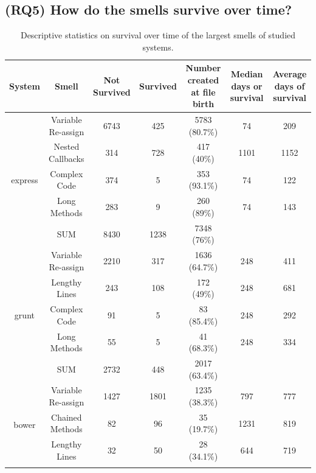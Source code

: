 {

\subsection*{(RQ5) How do the smells survive over time?}

\begin{table}[!htbp]
	\centering

	\caption{Descriptive statistics on survival over time of the largest smells of studied systems.}
	\begin{tabular}{c|c|c|c|c|c|c}
		\hline
		System & Smell & Not Survived & Survived & Number created at file birth & Median days or survival & Average days of survival \\ \hline
		\multirow{5}{*}{express}
		& Variable Re-assign & 6743 & 425 & 5783 (80.7\%) & 74 & 209 \\ \cline{2-7}
		& Nested Callbacks & 314 & 728 & 417 (40\%) & 1101 & 1152 \\ \cline{2-7}
		& Complex Code & 374 & 5 & 353 (93.1\%) & 74 & 122 \\ \cline{2-7}
		& Long Methods & 283 & 9 & 260 (89\%) & 74 & 143 \\ \cline{2-7}
		& SUM & 8430 & 1238 & 7348 (76\%) & & \\ \hline
		\multirow{5}{*}{grunt} 
		& Variable Re-assign & 2210 & 317 & 1636 (64.7\%) & 248 & 411 \\ \cline{2-7}
		& Lengthy Lines & 243 & 108 & 172 (49\%) & 248 & 681 \\ \cline{2-7}
		& Complex Code & 91 & 5 & 83 (85.4\%) & 248 & 292 \\ \cline{2-7}
		& Long Methods & 55 & 5 & 41 (68.3\%) & 248 & 334 \\ \cline{2-7}
		& SUM & 2732 & 448 & 2017 (63.4\%) & & \\ \hline
		\multirow{5}{*}{bower}
		& Variable Re-assign & 1427 & 1801 & 1235 (38.3\%) & 797 & 777 \\ \cline{2-7}
		& Chained Methods & 82 & 96 & 35 (19.7\%) & 1231 & 819 \\ \cline{2-7}
		& Lengthy Lines & 32 & 50 & 28 (34.1\%) & 644 & 719 \\ \cline{2-7}

\end{tabular}
\end{table}}
